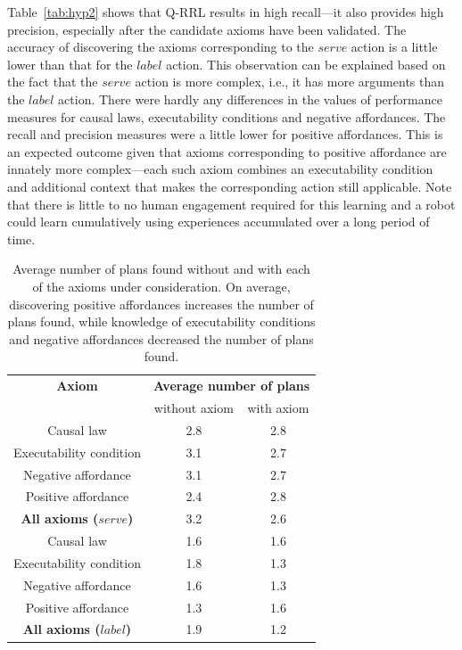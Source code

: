 \documentclass{article}
\begin{document}
Table~\ref{tab:hyp2} shows that Q-RRL results in high recall---it also
provides high precision, especially after the candidate axioms have
been validated. The accuracy of discovering the axioms corresponding
to the $serve$ action is a little lower than that for the $label$
action.  This observation can be explained based on the fact that the
$serve$ action is more complex, i.e., it has more arguments than the
$label$ action.  There were hardly any differences in the values of
performance measures for causal laws, executability conditions and
negative affordances. The recall and precision measures were a little
lower for positive affordances. This is an expected outcome given that
axioms corresponding to positive affordance are innately more
complex---each such axiom combines an executability condition and
additional context that makes the corresponding action still
applicable. Note that there is little to no human engagement required
for this learning and a robot could learn cumulatively using
experiences accumulated over a long period of time.

\begin{table}[tbh]
\centering
\begin{tabular}{|c|c|c|}
  \hline
\textbf{Axiom} & \multicolumn{2}{|c|}{\textbf{Average number of plans}}\\\cline{2-3}
& without axiom & with axiom \\\hline
Causal law & 2.8 & 2.8 \\ \hline
Executability condition & 3.1 & 2.7 \\ \hline
Negative affordance & 3.1 & 2.7 \\ \hline
Positive affordance & 2.4 & 2.8 \\ \hline
\textbf{All axioms ($serve$)} & 3.2 & 2.6 \\ \hline
Causal law & 1.6 & 1.6 \\ \hline
Executability condition & 1.8 & 1.3 \\ \hline
Negative affordance & 1.6 & 1.3 \\ \hline
Positive affordance & 1.3 & 1.6 \\ \hline
\textbf{All axioms ($label$)} & 1.9 & 1.2 \\ \hline
\end{tabular}
\caption{Average number of plans found without and with each of the axioms under consideration. On average, discovering positive affordances increases the number of plans found, while knowledge of executability conditions and negative affordances decreased the number of plans found.}
\label{tab:hyp3}
\end{table}
\end{document}
